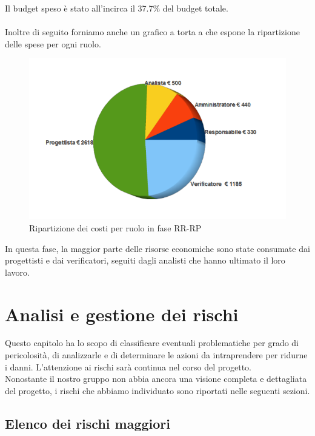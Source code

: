 Il budget speso \`e stato all'incirca il 37.7\% del budget totale.\\
\\
Inoltre di seguito forniamo anche un grafico a torta a che espone la
ripartizione delle spese per ogni ruolo.

\vspace{0cm}
\begin{figure}[htbp!]
  \centering
  \includegraphics[width=13cm, angle=0]{img/PP/COSTI-RP.png}
\caption{Ripartizione dei costi per ruolo in fase RR-RP}
\end{figure}
\vspace{0.5cm}

In questa fase, la maggior parte delle risorse economiche sono state consumate
dai progettisti e dai verificatori, seguiti dagli analisti che hanno ultimato il
loro lavoro.

\chapter{Analisi e gestione dei rischi}
\thispagestyle{fancy}

Questo capitolo ha lo scopo di classificare eventuali problematiche per grado
di pericolosit\`a, di analizzarle e di determinare le azioni da intraprendere per
ridurne i danni. L'attenzione ai rischi sar\`a continua nel corso del
progetto.\\ 
Nonostante il nostro gruppo non abbia ancora una visione completa e dettagliata del 
progetto, i rischi che abbiamo individuato sono riportati nelle seguenti sezioni.

\section{Elenco dei rischi maggiori}

